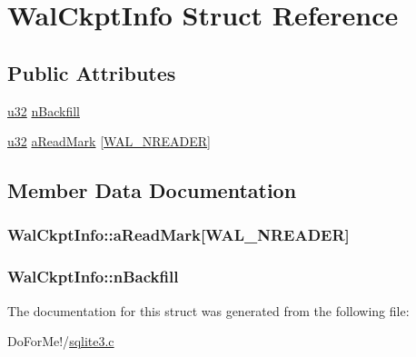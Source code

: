 \hypertarget{struct_wal_ckpt_info}{\section{Wal\-Ckpt\-Info Struct Reference}
\label{struct_wal_ckpt_info}
}
\subsection*{Public Attributes}
\begin{DoxyCompactItemize}
\item 
\hyperlink{sqlite3_8c_a03ad5adfaeb9b7640dde78a0cc390319}{u32} \hyperlink{struct_wal_ckpt_info_a5185e508f7da44c391b692e957a84ff6}{n\-Backfill}
\item 
\hyperlink{sqlite3_8c_a03ad5adfaeb9b7640dde78a0cc390319}{u32} \hyperlink{struct_wal_ckpt_info_a3bc01a8244045941d5f59f01123a7735}{a\-Read\-Mark} \mbox{[}\hyperlink{sqlite3_8c_a07fdcff8ba16a6a679a65ff4956087f6}{W\-A\-L\-\_\-\-N\-R\-E\-A\-D\-E\-R}\mbox{]}
\end{DoxyCompactItemize}


\subsection{Member Data Documentation}
\hypertarget{struct_wal_ckpt_info_a3bc01a8244045941d5f59f01123a7735}{
\subsubsection[{a\-Read\-Mark}]{ Wal\-Ckpt\-Info\-::a\-Read\-Mark\mbox{[}{\bf W\-A\-L\-\_\-\-N\-R\-E\-A\-D\-E\-R}\mbox{]}}}\label{struct_wal_ckpt_info_a3bc01a8244045941d5f59f01123a7735}
\hypertarget{struct_wal_ckpt_info_a5185e508f7da44c391b692e957a84ff6}{
\subsubsection[{n\-Backfill}]{ Wal\-Ckpt\-Info\-::n\-Backfill}}\label{struct_wal_ckpt_info_a5185e508f7da44c391b692e957a84ff6}


The documentation for this struct was generated from the following file\-:\begin{DoxyCompactItemize}
\item 
Do\-For\-Me!/\hyperlink{sqlite3_8c}{sqlite3.\-c}\end{DoxyCompactItemize}
